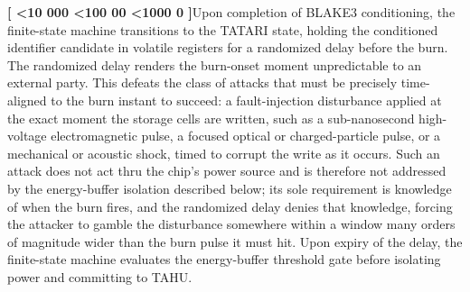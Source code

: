 \documentclass[12pt,letterpaper]{article}
\newcounter{para}
\newcommand{\padzero}{%
  \ifnum\value{para}<10 000\else%
  \ifnum\value{para}<100 00\else%
  \ifnum\value{para}<1000 0\else%
  \fi\fi\fi}
\newcommand{\para}{%
  \refstepcounter{para}\noindent\textbf{[\padzero\arabic{para}]}\hspace{0.5em}\ignorespaces}
\begin{document}
\para Upon completion of BLAKE3 conditioning, the finite-state machine transitions to the TATARI state, holding the conditioned identifier candidate in volatile registers for a randomized delay before the burn. The randomized delay renders the burn-onset moment unpredictable to an external party. This defeats the class of attacks that must be precisely time-aligned to the burn instant to succeed: a fault-injection disturbance applied at the exact moment the storage cells are written, such as a sub-nanosecond high-voltage electromagnetic pulse, a focused optical or charged-particle pulse, or a mechanical or acoustic shock, timed to corrupt the write as it occurs. Such an attack does not act thru the chip's power source and is therefore not addressed by the energy-buffer isolation described below; its sole requirement is knowledge of when the burn fires, and the randomized delay denies that knowledge, forcing the attacker to gamble the disturbance somewhere within a window many orders of magnitude wider than the burn pulse it must hit. Upon expiry of the delay, the finite-state machine evaluates the energy-buffer threshold gate before isolating power and committing to TAHU.
\end{document}
